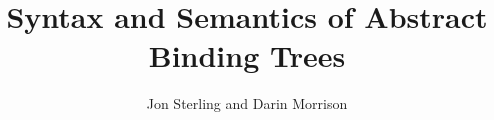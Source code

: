 \documentclass{llncs}
\numberwithin{equation}{section}
\begin{document}
\title{Syntax and Semantics of Abstract Binding Trees}
\date{}
\author{Jon Sterling and Darin Morrison}
\institute{}
\maketitle



\appendix
\appendixpage


\ifdraft{}{
  \newpage
  
  
}
\end{document}
